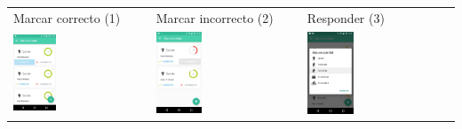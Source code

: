 {\begin{table}[!htbp]
\begin{tabular}{lll}
\textsf{\relax 
Marcar correcto (1)
} & \textsf{\relax 
Marcar incorrecto (2)
} & \textsf{\relax 
Responder (3)
}\\
    {\includegraphics[width=0.33\textwidth]{anexos/graphics/act_ok.jpg}}
 & 
    {\includegraphics[width=0.33\textwidth]{anexos/graphics/act_nook.jpg}}
 & 
    {\includegraphics[width=0.33\textwidth]{anexos/graphics/act_feed2.jpg}}
\\
\end{tabular}
\end{table}


}
